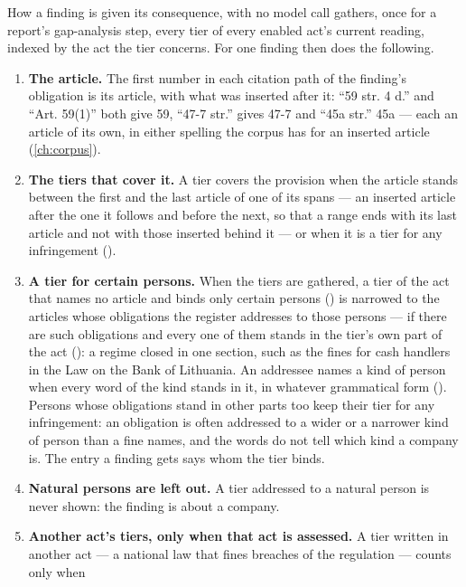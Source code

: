\begin{codebox}{How a finding is given its consequence, with no model call}
 gathers, once for a report's gap-analysis step, every tier of every
enabled act's current reading, indexed by the act the tier concerns. For one finding
 then does the following.
\begin{enumerate}
  \item \textbf{The article.} The first number in each citation path of the finding's
    obligation is its article, with what was inserted after it: \enquote{59 str. 4 d.} and
    \enquote{Art. 59(1)} both give 59, \enquote{47-7 str.} gives 47-7 and \enquote{45a str.}
    45a --- each an article of its own, in either spelling the corpus has for an inserted
    article (\cref{ch:corpus}).
  \item \textbf{The tiers that cover it.} A tier covers the provision when the article
    stands between the first and the last article of one of its spans --- an inserted
    article after the one it follows and before the next, so that a range ends with its last
    article and not with those inserted behind it --- or when it is a tier for any
    infringement ().
  \item \textbf{A tier for certain persons.} When the tiers are gathered, a tier of the act
    that names no article and binds only certain persons () is narrowed to the
    articles whose obligations the register addresses to those persons --- if there are such
    obligations and every one of them stands in the tier's own part of the act
    (): a regime closed in one section, such as the fines for cash handlers in
    the Law on the Bank of Lithuania. An addressee names a kind of person when every word of
    the kind stands in it, in whatever grammatical form (). Persons whose
    obligations stand in other parts too keep their tier for any infringement: an obligation
    is often addressed to a wider or a narrower kind of person than a fine names, and the
    words do not tell which kind a company is. The entry a finding gets says whom the tier
    binds.
  \item \textbf{Natural persons are left out.} A tier addressed to a natural person is never
    shown: the finding is about a company.
  \item \textbf{Another act's tiers, only when that act is assessed.} A tier written in
    another act --- a national law that fines breaches of the regulation --- counts only when

\end{enumerate}
\end{codebox}
